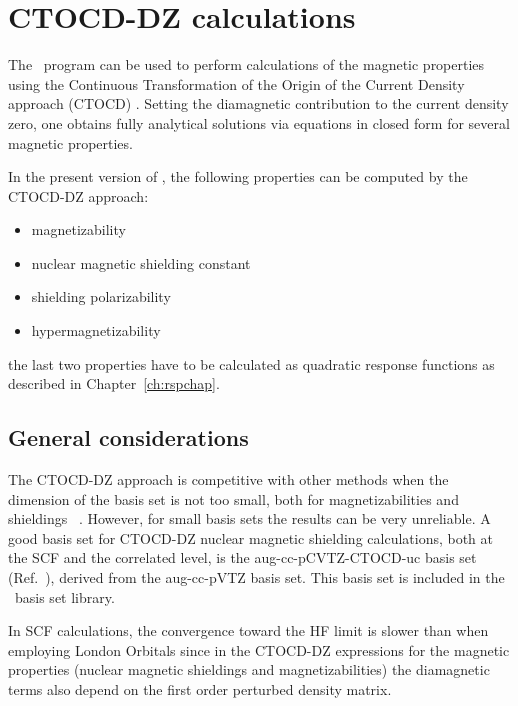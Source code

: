 \section{CTOCD-DZ calculations}\label{sec:ctocd}

The \dalton\ program can be used to perform calculations of the magnetic
properties using the Continuous Transformation of the Origin of the Current Density
approach (CTOCD) . Setting the diamagnetic contribution
to the current density zero, one obtains fully analytical solutions via equations
in closed form for several magnetic properties.


In the present version of \dalton, the following properties can be computed by
the CTOCD-DZ approach:

\begin{center}
\begin{itemize}{}{}
\item magnetizability
\item nuclear magnetic shielding constant
\item shielding polarizability
\item hypermagnetizability
\end{itemize}
\end{center}
the last two properties have to be calculated as quadratic response functions as described
in Chapter~\ref{ch:rspchap}.

\subsection{General considerations}\label{sec:ctocdgeneral}

The CTOCD-DZ approach is competitive with other methods when the dimension
of the basis set is not too small, both for magnetizabilities and
shieldings ~\cite{ctocd}. However, for small basis sets the results can be
very unreliable. A good basis set for CTOCD-DZ nuclear magnetic shielding
calculations, both at the SCF and the correlated level, is the aug-cc-pCVTZ-CTOCD-uc
basis set (Ref.~\cite{ctocd}), derived from the aug-cc-pVTZ basis set.
This basis set is included in the \dalton\ basis set library.

In SCF calculations, the convergence toward the HF limit is slower
than when employing London Orbitals since in the CTOCD-DZ expressions for
the magnetic properties (nuclear magnetic shieldings and magnetizabilities)
the diamagnetic terms also depend on the first order perturbed density matrix.

